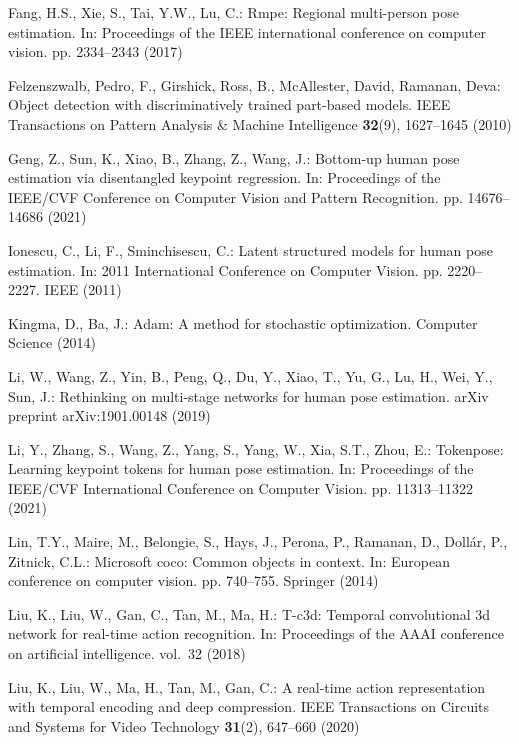 \documentclass[runningheads]{llncs}
\begin{document}
\begin{thebibliography}{10}
Fang, H.S., Xie, S., Tai, Y.W., Lu, C.: Rmpe: Regional multi-person pose
  estimation. In: Proceedings of the IEEE international conference on computer
  vision. pp. 2334--2343 (2017)

Felzenszwalb, Pedro, F., Girshick, Ross, B., McAllester, David, Ramanan, Deva:
  Object detection with discriminatively trained part-based models. IEEE
  Transactions on Pattern Analysis \& Machine Intelligence  \textbf{32}(9),
  1627--1645 (2010)

Geng, Z., Sun, K., Xiao, B., Zhang, Z., Wang, J.: Bottom-up human pose
  estimation via disentangled keypoint regression. In: Proceedings of the
  IEEE/CVF Conference on Computer Vision and Pattern Recognition. pp.
  14676--14686 (2021)

Ionescu, C., Li, F., Sminchisescu, C.: Latent structured models for human pose
  estimation. In: 2011 International Conference on Computer Vision. pp.
  2220--2227. IEEE (2011)

Kingma, D., Ba, J.: Adam: A method for stochastic optimization. Computer
  Science  (2014)

Li, W., Wang, Z., Yin, B., Peng, Q., Du, Y., Xiao, T., Yu, G., Lu, H., Wei, Y.,
  Sun, J.: Rethinking on multi-stage networks for human pose estimation. arXiv
  preprint arXiv:1901.00148  (2019)

Li, Y., Zhang, S., Wang, Z., Yang, S., Yang, W., Xia, S.T., Zhou, E.:
  Tokenpose: Learning keypoint tokens for human pose estimation. In:
  Proceedings of the IEEE/CVF International Conference on Computer Vision. pp.
  11313--11322 (2021)

Lin, T.Y., Maire, M., Belongie, S., Hays, J., Perona, P., Ramanan, D.,
  Doll{\'a}r, P., Zitnick, C.L.: Microsoft coco: Common objects in context. In:
  European conference on computer vision. pp. 740--755. Springer (2014)

Liu, K., Liu, W., Gan, C., Tan, M., Ma, H.: T-c3d: Temporal convolutional 3d
  network for real-time action recognition. In: Proceedings of the AAAI
  conference on artificial intelligence. vol.~32 (2018)

Liu, K., Liu, W., Ma, H., Tan, M., Gan, C.: A real-time action representation
  with temporal encoding and deep compression. IEEE Transactions on Circuits
  and Systems for Video Technology  \textbf{31}(2),  647--660 (2020)


\end{thebibliography}
\end{document}
